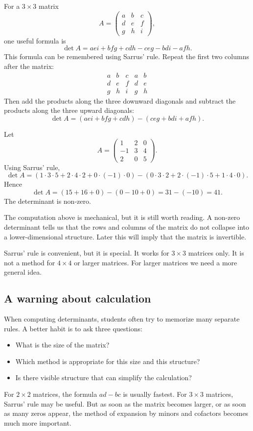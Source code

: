 For a \(3\times3\) matrix
\[
A=\begin{pmatrix}
a&b&c\\
d&e&f\\
g&h&i
\end{pmatrix},
\]
one useful formula is
\[
\det A=aei+bfg+cdh-ceg-bdi-afh.
\]
This formula can be remembered using Sarrus' rule. Repeat the first two columns after the matrix:
\[
\begin{array}{ccc|cc}
a&b&c&a&b\\
d&e&f&d&e\\
g&h&i&g&h
\end{array}
\]
Then add the products along the three downward diagonals and subtract the products along the three upward diagonals:
\[
\det A=(aei+bfg+cdh)-(ceg+bdi+afh).
\]

\begin{examplebox}
Let
\[
A=\begin{pmatrix}
1&2&0\\
-1&3&4\\
2&0&5
\end{pmatrix}.
\]
Using Sarrus' rule,
\[
\det A=(1\cdot3\cdot5+2\cdot4\cdot2+0\cdot(-1)\cdot0)
-(0\cdot3\cdot2+2\cdot(-1)\cdot5+1\cdot4\cdot0).
\]
Hence
\[
\det A=(15+16+0)-(0-10+0)=31-(-10)=41.
\]
The determinant is non-zero.
\end{examplebox}

The computation above is mechanical, but it is still worth reading. A non-zero determinant tells us that the rows and columns of the matrix do not collapse into a lower-dimensional structure. Later this will imply that the matrix is invertible.

\begin{remarkbox}
Sarrus' rule is convenient, but it is special. It works for \(3\times3\) matrices only. It is not a method for \(4\times4\) or larger matrices. For larger matrices we need a more general idea.
\end{remarkbox}

\subsection{A warning about calculation}

When computing determinants, students often try to memorize many separate rules. A better habit is to ask three questions:
\begin{itemize}
\item What is the size of the matrix?
\item Which method is appropriate for this size and this structure?
\item Is there visible structure that can simplify the calculation?
\end{itemize}
For \(2\times2\) matrices, the formula \(ad-bc\) is usually fastest. For \(3\times3\) matrices, Sarrus' rule may be useful. But as soon as the matrix becomes larger, or as soon as many zeros appear, the method of expansion by minors and cofactors becomes much more important.
